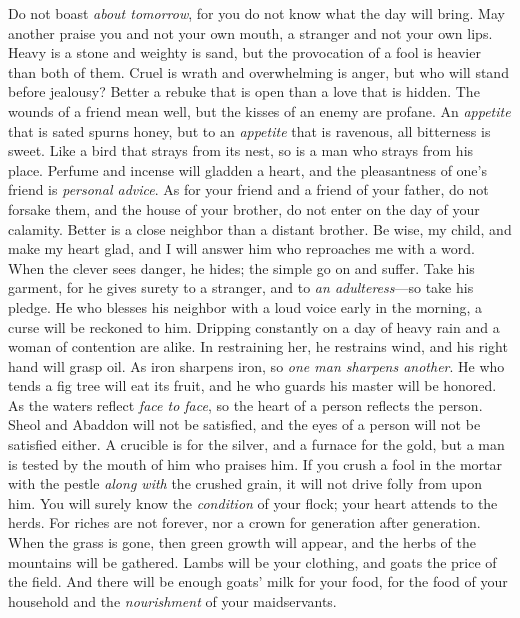 \begin{biblechapter} %
\verse Do not boast \textit{about tomorrow}, 
for you do not know what the day will bring.
\verse May another praise you and not your own mouth, 
a stranger and not your own lips.
\verse Heavy is a stone and weighty is sand, 
but the provocation of a fool is heavier than both of them.
\verse Cruel is wrath and overwhelming is anger, 
but who will stand before jealousy?
\verse Better a rebuke that is open 
than a love that is hidden.
\verse The wounds of a friend mean well, 
but the kisses of an enemy are profane.
\verse An \textit{appetite} that is sated spurns honey, 
but to an \textit{appetite} that is ravenous, all bitterness is sweet.
\verse Like a bird that strays from its nest, 
so is a man who strays from his place.
\verse Perfume and incense will gladden a heart, 
and the pleasantness of one’s friend is \textit{personal advice}.
\verse As for your friend and a friend of your father, do not forsake them, 
and the house of your brother, do not enter on the day of your calamity. 
Better is a close neighbor than a distant brother.
\verse Be wise, my child, and make my heart glad, 
and I will answer him who reproaches me with a word.
\verse When the clever sees danger, he hides; 
the simple go on and suffer.
\verse Take his garment, for he gives surety to a stranger, 
and to \textit{an adulteress}—so take his pledge.
\verse He who blesses his neighbor with a loud voice 
early in the morning, 
a curse will be reckoned to him.
\verse Dripping constantly on a day of heavy rain 
and a woman of contention are alike.
\verse In restraining her, he restrains wind, 
and his right hand will grasp oil.
\verse As iron sharpens iron, 
so \textit{one man sharpens another}.
\verse He who tends a fig tree will eat its fruit, 
and he who guards his master will be honored.
\verse As the waters reflect \textit{face to face}, 
so the heart of a person reflects the person.
\verse Sheol and Abaddon will not be satisfied, 
and the eyes of a person will not be satisfied either.
\verse A crucible is for the silver, and a furnace for the gold, 
but a man is tested by the mouth of him who praises him.
\verse If you crush a fool in the mortar with the pestle \textit{along with} the crushed grain, 
it will not drive folly from upon him.
\verse You will surely know the \textit{condition} of your flock; 
your heart attends to the herds.
\verse For riches are not forever, 
nor a crown for generation after generation.
\verse When the grass is gone, then green growth will appear, 
and the herbs of the mountains will be gathered.
\verse Lambs will be your clothing, 
and goats the price of the field.
\verse And there will be enough goats’ milk for your food, 
for the food of your household and the \textit{nourishment} of your maidservants.
\end{biblechapter}

